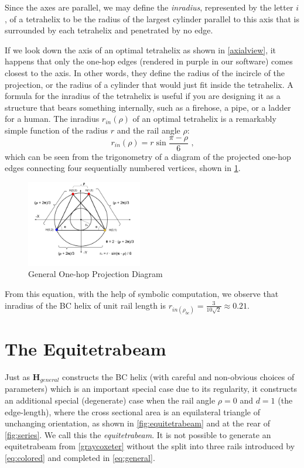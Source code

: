 \documentclass[twocolumn,10pt]{asme2ej}
\renewcommand{\vec}[1]{\mathbf{#1}}
\begin{document}
Since the axes are parallel, we may define the \emph{inradius}, represented by the letter $i$, of a
tetrahelix to be the radius of the largest
cylinder parallel to this axis that is surrounded by each tetrahelix and penetrated by no edge.


If we look down the axis of an optimal tetrahelix as shown in \cref{axialview}, it happens that only
the one-hop edges
(rendered in purple in our software)
comes closest to the axis. In other words, they define the radius of the incircle of the
projection, or the radius of a cylinder that would just fit inside the tetrahelix.
A formula for the inradius of the tetrahelix is useful if you are designing it as a structure that bears something internally,
such as a firehose, a pipe, or
a ladder for a human. The inradius $r_{in}(\rho)$ of
an optimal tetrahelix is a remarkably simple function of the radius $r$ and the rail angle $\rho$:
\begin{equation}
  \label{eq:inradius}
  r_{in}(\rho) = r \sin{\frac{\pi - \rho}{6}} \text{ ,}
\end{equation}
which can be seen from the trigonometry of a diagram of the projected one-hop edges
connecting four sequentially numbered vertices, shown in \cref{fig:projectiondiagram}.

\begin{figure}
     \centering
     \includegraphics[width=0.45\textwidth]{figures/ProjectionDiagram.png}
     \caption{General One-hop Projection Diagram}
  \label{fig:projectiondiagram}
\end{figure}

From this equation, with the help of symbolic computation, we observe that inradius of the BC helix of unit rail length is $r_{in(\rho_{bc})} = \frac{3}{10\sqrt{2}} \approx 0.21$.

\section{The Equitetrabeam}
\label{sec:equitetrabeam}

Just as $\vec{H}_{general}$ constructs the BC helix (with careful and non-obvious choices of parameters)
which is an important
special case due to its regularity, it constructs an additional special
(degenerate) case when the rail angle $\rho = 0$
and $d = 1$ (the edge-length), where the cross sectional area is
an equilateral triangle of unchanging orientation, as shown in \cref{fig:equitetrabeam} and at the rear of \cref{fig:series}.
We call this the \emph{equitetrabeam}. It is not possible to generate an equitetrabeam from 
\cref{graycoxeter}
without the split into three rails introduced by \cref{eq:colored} and completed in  \cref{eq:general}.
\end{document}
